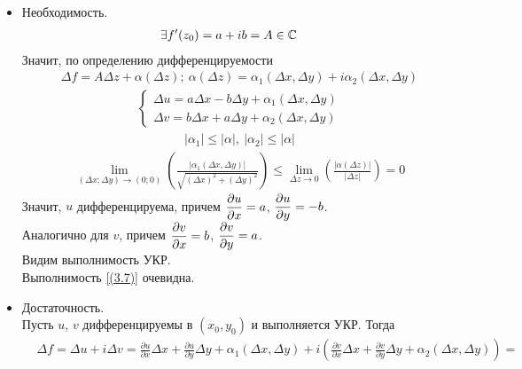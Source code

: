 \begin{itemize}
    \item Необходимость.
    \begin{align*}
      & \exists f'(z_0) = a+ib = A \in \mathbb{C}
    \end{align*}
    Значит, по определению дифференцируемости
    \begin{align*}
      & \Delta f = A \Delta z + \alpha(\Delta z); \ \alpha(\Delta z) = \alpha_1(\Delta x, \Delta y) + i\alpha_2(\Delta x, \Delta y)
    \end{align*}
    \begin{align*}
      & \left\{ \begin{matrix}
              \Delta u = a \Delta x - b \Delta y + \alpha_1(\Delta x, \Delta y) \\
              \Delta v = b \Delta x + a \Delta y + \alpha_2(\Delta x, \Delta y)
          \end{matrix} \right.
    \end{align*}
    \begin{align*}
      & \left| \alpha_1 \right| \leq \left| \alpha \right|, \ \left| \alpha_2 \right| \leq \left| \alpha \right|
    \end{align*}
    \begin{align*}
      & \lim_{(\Delta x; \Delta y) \to (0;0)}\left( \frac{\left| \alpha_1(\Delta x, \Delta y) \right|}{\sqrt{\left( \Delta x \right)^2 + \left( \Delta y \right)^2}} \right) \leq \lim_{\Delta z \to 0}\left( \frac{\left| \alpha(\Delta z) \right|}{\left| \Delta z \right|} \right) = 0
    \end{align*}
    Значит, $u$ дифференцируема, причем $\displaystyle \frac{\partial u}{\partial x} =
    a$, $\displaystyle \frac{\partial u}{\partial y} = -b$.
    \\
    Аналогично для $v$, причем $\displaystyle \frac{\partial v}{\partial x} = b$, $\displaystyle
    \frac{\partial v}{\partial y} = a$.
    \\
    Видим выполнимость УКР.
    \\
    Выполнимость \eqref{(3.7)} очевидна.
    \item Достаточность.
    \\
    Пусть $u$, $v$ дифференцируемы в $(x_0,y_0)$ и выполняется УКР. Тогда
    \begin{align*}
      & \Delta f = \Delta u + i \Delta v = \frac{\partial u}{\partial x} \Delta x + \frac{\partial u}{\partial y} \Delta y + \alpha_1(\Delta x, \Delta y) + i \left( \frac{\partial v}{\partial x} \Delta x + \frac{\partial v}{\partial y} \Delta y + \alpha_2(\Delta x, \Delta y)\right) = \\

\end{align*}
\end{itemize}
